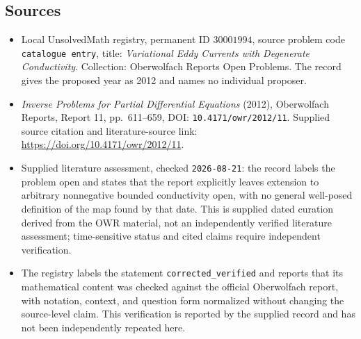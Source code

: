 \documentclass[11pt]{article}
\begin{document}
\subsection{Sources}
\begin{itemize}
\item Local UnsolvedMath registry, permanent ID \(30001994\), source problem code \texttt{catalogue entry}, title: \emph{Variational Eddy Currents with Degenerate Conductivity}. Collection: Oberwolfach Reports Open Problems. The record gives the proposed year as 2012 and names no individual proposer.
\item \emph{Inverse Problems for Partial Differential Equations} (2012), Oberwolfach Reports, Report 11, pp.\ 611--659, DOI: \texttt{10.4171/owr/2012/11}. Supplied source citation and literature-source link: \url{https://doi.org/10.4171/owr/2012/11}.
\item Supplied literature assessment, checked \texttt{2026-08-21}: the record labels the problem open and states that the report explicitly leaves extension to arbitrary nonnegative bounded conductivity open, with no general well-posed definition of the map found by that date. This is supplied dated curation derived from the OWR material, not an independently verified literature assessment; time-sensitive status and cited claims require independent verification.
\item The registry labels the statement \texttt{corrected\_verified} and reports that its mathematical content was checked against the official Oberwolfach report, with notation, context, and question form normalized without changing the source-level claim. This verification is reported by the supplied record and has not been independently repeated here.
\end{itemize}
\end{document}
